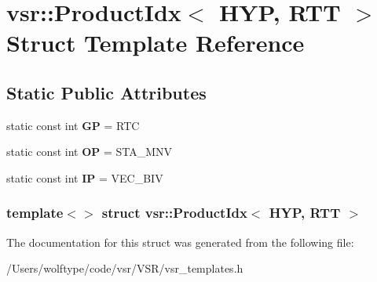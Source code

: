 \hypertarget{structvsr_1_1_product_idx_3_01_h_y_p_00_01_r_t_t_01_4}{\section{vsr\-:\-:Product\-Idx$<$ H\-Y\-P, R\-T\-T $>$ Struct Template Reference}
\label{structvsr_1_1_product_idx_3_01_h_y_p_00_01_r_t_t_01_4}
}
\subsection*{Static Public Attributes}
\begin{DoxyCompactItemize}
\item 
\hypertarget{structvsr_1_1_product_idx_3_01_h_y_p_00_01_r_t_t_01_4_a7015251ccddf5bf09466207e583efca1}{static const int {\bfseries G\-P} = R\-T\-C}\label{structvsr_1_1_product_idx_3_01_h_y_p_00_01_r_t_t_01_4_a7015251ccddf5bf09466207e583efca1}

\item 
\hypertarget{structvsr_1_1_product_idx_3_01_h_y_p_00_01_r_t_t_01_4_ac6918d68f02eb1e49e17e0cd8db30f6d}{static const int {\bfseries O\-P} = S\-T\-A\-\_\-\-M\-N\-V}\label{structvsr_1_1_product_idx_3_01_h_y_p_00_01_r_t_t_01_4_ac6918d68f02eb1e49e17e0cd8db30f6d}

\item 
\hypertarget{structvsr_1_1_product_idx_3_01_h_y_p_00_01_r_t_t_01_4_aff59b8fd7f16e732d88ca2887089102c}{static const int {\bfseries I\-P} = V\-E\-C\-\_\-\-B\-I\-V}\label{structvsr_1_1_product_idx_3_01_h_y_p_00_01_r_t_t_01_4_aff59b8fd7f16e732d88ca2887089102c}

\end{DoxyCompactItemize}
\subsubsection*{template$<$$>$ struct vsr\-::\-Product\-Idx$<$ H\-Y\-P, R\-T\-T $>$}



The documentation for this struct was generated from the following file\-:\begin{DoxyCompactItemize}
\item 
/\-Users/wolftype/code/vsr/\-V\-S\-R/vsr\-\_\-templates.\-h\end{DoxyCompactItemize}
